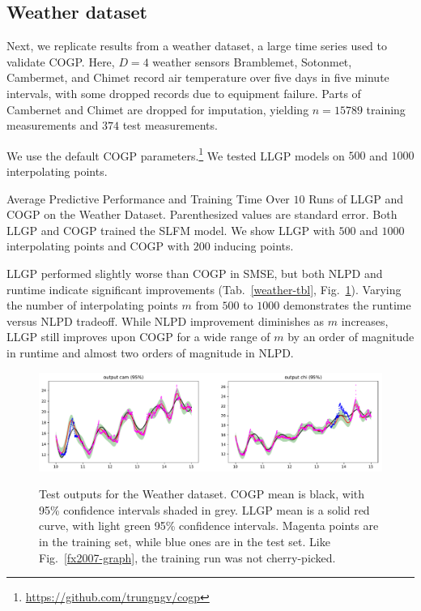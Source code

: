 \documentclass[twoside]{article}
\begin{document}
\subsection{Weather dataset}\label{large-bench}

Next, we replicate results from a weather dataset, a large time series used to validate COGP. Here, $D=4$ weather sensors Bramblemet, Sotonmet, Cambermet, and Chimet record air temperature over five days in five minute intervals, with some dropped records due to equipment failure. Parts of Cambernet and Chimet are dropped for imputation, yielding $n=15789$ training measurements and $374$ test measurements. 

We use the default COGP parameters.\footnote{\url{https://github.com/trungngv/cogp}} We tested LLGP models on $500$ and $1000$ interpolating points.

\begin{table}[!ht]
  \caption{Average Predictive Performance and Training Time Over $10$ Runs of LLGP and COGP on the Weather Dataset. Parenthesized values are standard error. Both LLGP and COGP trained the SLFM model. We show LLGP with $500$ and $1000$ interpolating points and COGP with $200$ inducing points.}
\label{weather-tbl}
\begin{center}
  \begin{small}
    \begin{sc}
      
\end{sc}
\end{small}
\end{center}

\end{table}

LLGP performed slightly worse than COGP in SMSE, but both NLPD and runtime indicate significant improvements (Tab.~\ref{weather-tbl}, Fig.~\ref{weather-fig}). Varying the number of interpolating points $m$ from $500$ to $1000$ demonstrates the runtime versus NLPD tradeoff. While NLPD improvement diminishes as $m$ increases, LLGP still improves upon COGP for a wide range of $m$ by an order of magnitude in runtime and almost two orders of magnitude in NLPD.


\begin{figure}[!ht]
\centering
{\includegraphics[width=\textwidth]{weather.pdf}}
\caption{Test outputs for the Weather dataset. COGP mean is black, with 95\% confidence intervals shaded in grey. LLGP mean is a solid red curve, with light green 95\% confidence intervals. Magenta points are in the training set, while blue ones are in the test set. Like Fig.~\ref{fx2007-graph}, the training run was not cherry-picked.}
\label{weather-fig}
\end{figure}
\end{document}

